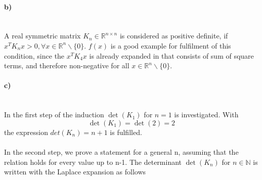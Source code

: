 \paragraph{b)}\mbox{} \\
A real symmetric matrix $K_n \in \mathbb{R}^{n \times n}$ is considered as positive definite, if $x^T K_n x > 0, \forall x \in \mathbb{R}^n \backslash \{0\}$. $f(x)$ is a good example for fulfilment of this condition, since the $x^T K_4 x$ is already expanded in  that consists of sum of square terms, and therefore non-negative for all $x \in \mathbb{R}^n \backslash \{0\}$.

\paragraph{c)}\mbox{} \\
In the first step of the induction $\det(K_1)$ for $n = 1$ is investigated. With
\begin{equation}
	\det(K_1) = \det(2) = 2
\end{equation}
the expression $det(K_n) = n + 1 $ is fulfilled.
\\
\\
In the second step, we prove a statement for a general n, assuming that the relation holds for every value up to n-1. The determinant $\det (K_n)$ for $n \in \mathbb{N}$ is written with the Laplace expansion as follows
